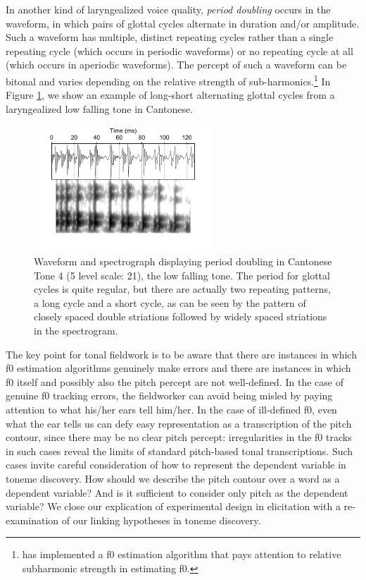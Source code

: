 \documentclass[12pt]{article}
\begin{document}
  In
another kind of laryngealized voice quality, \textit{period doubling} occurs in the
waveform, in which pairs of glottal cycles alternate in duration
and/or amplitude. Such a waveform has multiple, distinct repeating cycles rather
than a single repeating cycle (which occurs in periodic waveforms) or
no repeating cycle at all (which occurs in aperiodic waveforms). The
percept of such a waveform can be bitonal and varies depending on the
relative strength of sub-harmonics.\footnote{\citet{Sun:2002a} has implemented a
f0 estimation algorithm that pays attention to relative subharmonic strength in
estimating f0.} In Figure \ref{fig:pd}, we show an example of
long-short alternating glottal cycles from a laryngealized low falling
tone in Cantonese.
 
\begin{figure}
  \centering
  \includegraphics[width=0.6\textwidth]{pd2}%
  \caption{Waveform and spectrograph displaying period doubling in
    Cantonese Tone 4 (5 level scale: 21), the low falling
    tone. The period for glottal cycles is quite regular, but there
    are actually two repeating patterns, a long cycle and a short
    cycle, as can be seen by the pattern of closely spaced double
    striations followed by widely spaced striations in the spectrogram.}
  \label{fig:pd}
\end{figure}

The key point for tonal fieldwork is to be aware that there are
instances in which f0 estimation algorithms genuinely make errors and
there are instances in which f0 itself and possibly also the pitch
percept are not well-defined. In the case of genuine f0 tracking
errors, the fieldworker can avoid being misled by paying attention to
what his/her ears tell him/her. In the case of ill-defined f0, even what the ear tells us can defy easy representation as a transcription
of the pitch contour, since there may be no clear pitch
percept: irregularities in the f0 tracks in such cases reveal the
limits of standard pitch-based tonal transcriptions. Such cases invite careful consideration of how to represent the
dependent variable in toneme discovery. How should we describe the
pitch contour over a word as a dependent variable? And is it
sufficient to consider only pitch as the dependent variable? We close
our explication of experimental design in elicitation with a
re-examination of our linking hypotheses in toneme discovery.  
\end{document}
